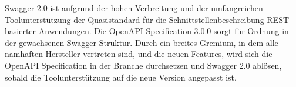 
Swagger 2.0 ist aufgrund der hohen Verbreitung und der umfangreichen Toolunterstützung der Quasistandard für die Schnittstellenbeschreibung REST-basierter Anwendungen. Die OpenAPI Specification 3.0.0 sorgt für Ordnung in der gewachsenen Swagger-Struktur. Durch ein breites Gremium, in dem alle namhaften Hersteller vertreten sind, und die neuen Features, wird sich die OpenAPI Specification in der Branche durchsetzen und Swagger 2.0 ablösen, sobald die Toolunterstützung auf die neue Version angepasst ist.






